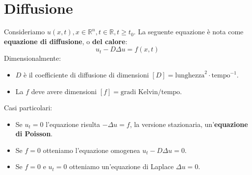 \chapter{Diffusione}

Consideriamo $u(x,t),x\in \mathbb{R}^{n},t\in \mathbb{R},t\geq t_{0}$. La seguente equazione è nota come \textbf{equazione di diffusione}, o \textbf{del calore}:
\begin{equation*}
    \boxed{u_{t} -D\Delta u=f(x,t)}
\end{equation*}
Dimensionalmente:
\begin{itemize}
    \item $D$ è il coefficiente di diffusione di dimensioni $[ D] =\text{lunghezza}^{2} \cdotp \text{tempo}^{-1}$.
    \item La $f$ deve avere dimensioni $[ f] =\text{gradi Kelvin} /\text{tempo}$.
\end{itemize}

Casi particolari:
\begin{itemize}
    \item Se $u_{t} =0$ l'equazione risulta $-\Delta u=f$, la versione stazionaria, un'\textbf{equazione di Poisson}.
    \item Se $f=0$ otteniamo l'equazione omogenea $u_{t} -D\Delta u=0$.
    \item Se $f=0$ e $u_{t} =0$ otteniamo un'equazione di Laplace $\Delta u=0$.
\end{itemize}

